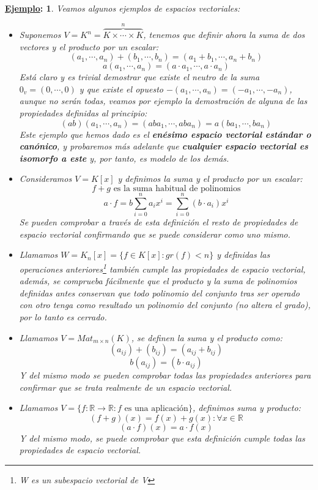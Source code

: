 \documentclass[10pt,a4paper,openright]{book}
\theoremstyle{break}
\newtheorem*{ej}{\underline{Ejemplo}:}
\begin{document}
\begin{ej}
Veamos algunos ejemplos de espacios vectoriales:
\begin{itemize}
\item Suponemos $V=K^n=\overbrace{K\times \cdots \times K}^{n}$, tenemos que definir ahora la suma de dos vectores y el producto por un escalar:
 $$(a_1, \cdots, a_n)+(b_1, \cdots, b_n)=(a_1+b_1, \cdots, a_n+ b_n)$$
 $$a(a_1, \cdots, a_n)=(a\cdot a_1, \cdots, a\cdot a_n)$$
Está claro y es trivial demostrar que existe el neutro de la suma $0_v=(0,\cdots,0)$ y que existe el opuesto $-(a_1, \cdots, a_n)=(-a_1, \cdots, -a_n)$, aunque no serán todas, veamos por ejemplo  la demostración de alguna de las propiedades definidas al principio:
$$(ab)(a_1, \cdots, a_n)=(aba_1, \cdots, aba_n)=a(ba_1, \cdots, ba_n)$$
Este ejemplo que hemos dado es el \textbf{enésimo espacio vectorial estándar o canónico}, y probaremos más adelante que \textbf{cualquier espacio vectorial es isomorfo a este} y, por tanto, es modelo de los demás.

\item Consideramos $V=K[x]$ y definimos la suma y el producto por un escalar:
$$f+g\mbox{ es la suma habitual de polinomios}$$
$$a\cdot f=b\sum_{i=0}^n a_ix^i=\sum_{i=0}^n (b\cdot a_i)x^i$$
Se pueden comprobar a través de esta definición el resto de propiedades de espacio vectorial confirmando que se puede considerar como uno mismo.

\item Llamamos $W=K_n[x]=\{f\in K[x]: gr(f)<n\}$ y definidas las operaciones anteriores\footnote{W es un subespacio vectorial de V} también cumple las propiedades de espacio vectorial, además, se comprueba fácilmente que el producto y la suma de polinomios definidas antes conservan que todo polinomio del conjunto tras ser operado con otro tenga como resultado un polinomio del conjunto (no altera el grado), por lo tanto es cerrado.

\item Llamamos $V=Mat_{m\times n}(K)$, se definen la suma y el producto como:
$$(a_{ij})+(b_{ij})=(a_{ij}+b_{ij})$$
$$b(a_{ij})=(b\cdot a_{ij})$$
Y del mismo modo se pueden comprobar todas las propiedades anteriores para confirmar que se trata realmente de un espacio vectorial.

\item Llamamos $V=\{f: \mathbb R\rightarrow \mathbb R: f \mbox{ es una aplicación}\}$, definimos suma y producto:
$$(f+g)(x)=f(x)+g(x):\forall x \in \mathbb R$$
$$(a\cdot f)(x)=a\cdot f(x)$$
Y del mismo modo, se puede comprobar que esta definición cumple todas las propiedades de espacio vectorial.
\end{itemize}
\end{ej}
\end{document}
